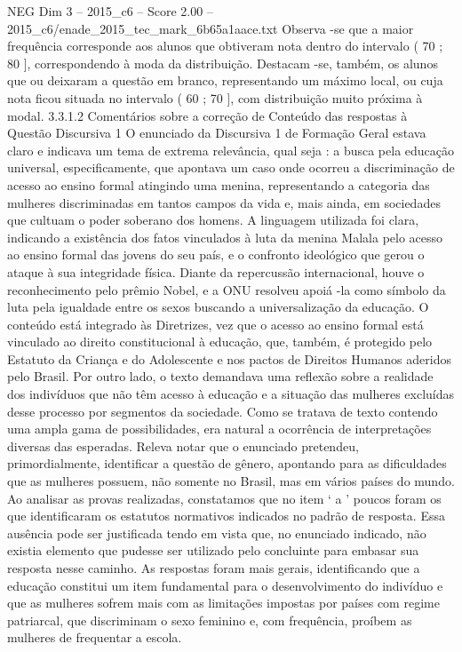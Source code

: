 \begin{textsample}{NEG Dim 3 – 2015\_c6 – Score 2.00 – 2015\_c6/enade\_2015\_tec\_mark\_6b65a1aace.txt}
Observa -se que a maior frequência corresponde aos alunos que obtiveram nota dentro do intervalo ( 70 ; 80 ], correspondendo à moda da distribuição.
Destacam -se, também, os alunos que ou deixaram a questão em branco, representando um máximo local, ou cuja nota ficou situada no intervalo ( 60 ; 70 ], com distribuição muito próxima à modal. 3.3.1.2 Comentários sobre a correção de Conteúdo das respostas à Questão Discursiva 1 O enunciado da Discursiva 1 de Formação Geral estava claro e indicava um tema de extrema relevância, qual seja : a busca pela educação universal, especificamente, que apontava um caso onde ocorreu a discriminação de acesso ao ensino formal atingindo uma menina, representando a categoria das mulheres discriminadas em tantos campos da vida e, mais ainda, em sociedades que cultuam o poder soberano dos homens.
A linguagem utilizada foi clara, indicando a existência dos fatos vinculados à luta da menina Malala pelo acesso ao ensino formal das jovens do seu país, e o confronto ideológico que gerou o ataque à sua integridade física.
Diante da repercussão internacional, houve o reconhecimento pelo prêmio Nobel, e a ONU resolveu apoiá -la como símbolo da luta pela igualdade entre os sexos buscando a universalização da educação.
O conteúdo está integrado às Diretrizes, vez que o acesso ao ensino formal está vinculado ao direito constitucional à educação, que, também, é protegido pelo Estatuto da Criança e do Adolescente e nos pactos de Direitos Humanos aderidos pelo Brasil.
Por outro lado, o texto demandava uma reflexão sobre a realidade dos indivíduos que não têm acesso à educação e a situação das mulheres excluídas desse processo por segmentos da sociedade.
Como se tratava de texto contendo uma ampla gama de possibilidades, era natural a ocorrência de interpretações diversas das esperadas.
Releva notar que o enunciado pretendeu, primordialmente, identificar a questão de gênero, apontando para as dificuldades que as mulheres possuem, não somente no Brasil, mas em vários países do mundo.
Ao analisar as provas realizadas, constatamos que no item ‘ a ’ poucos foram os que identificaram os estatutos normativos indicados no padrão de resposta.
Essa ausência pode ser justificada tendo em vista que, no enunciado indicado, não existia elemento que pudesse ser utilizado pelo concluinte para embasar sua resposta nesse caminho.
As respostas foram mais gerais, identificando que a educação constitui um item fundamental para o desenvolvimento do indivíduo e que as mulheres sofrem mais com as limitações impostas por países com regime patriarcal, que discriminam o sexo feminino e, com frequência, proíbem as mulheres de frequentar a escola.

\end{textsample}

